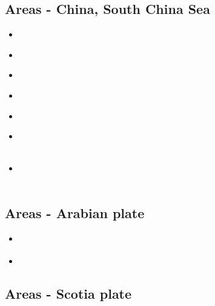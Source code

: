 \subsection{Areas - China, South China Sea}

\begin{scriptsize}
\begin{itemize}
\item[\twothousandten] 
\textcite{zhst10} \\
\item[\twothousandfifteen] 
\textcite{wazh15} \\
\item[\twothousandsixteen] 
\textcite{guyr16} \\
\item[\twothousandeighteen] 
\textcite{lecd18} \\
\item[\twothousandnineteen] 
\textcite{lixs19} \\
\item[\twothousandtwenty] 
\textcite{dawl20} \\
\textcite{lisy20} \\
\item[\twothousandtwentyone] 
\textcite{qill21} \\
\textcite{yalz21} \\
\end{itemize}
\end{scriptsize}

\subsection{Areas - Arabian plate}

\begin{scriptsize}
\begin{itemize}
\item[\twothousandthirteen] \textcite{fabj13}
\item[\twothousandfifteen] \textcite{rerl15}
\end{itemize}
\end{scriptsize}

\subsection{Areas - Scotia plate}

